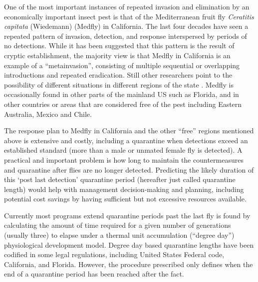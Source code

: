 \documentclass[10pt,a4paper,twocolumn]{article}
\begin{document}
One of the most important instances of repeated invasion 
and elimination by an economically important insect pest is that of 
the Mediterranean fruit fly \textit{Ceratitis capitata} (Wiedemann) (Medfly) 
in California.  
The last four decades have seen a repeated pattern of
invasion, detection, and response 
interspersed by periods of no detections\cite{carey_establishment_1991, papadopoulos_trickle_2013}.
While it has been suggested that this pattern is the result of
cryptic establishment\cite{carey201730}, 
the majority view is
that Medfly in California is an example of 
a ``metainvasion'', consisting of multiple sequential or
overlapping introductions\cite{davies_bioinvasions_1999}
and repeated eradication\cite{haymer_genetic_1997}.
Still other researchers point to the possibility of different situations
in different regions of the state
\cite{bonizzoni_microsatellite_2001,gasperi_genetic_2002}.
Medfly is occasionally found in 
other parts of the mainland US such as Florida\cite{szyniszewska2016analysis},
and in other countries or areas that are considered 
free of the pest including Eastern Australia, Mexico and Chile\cite{mcinnis2017can}.

The response plan to Medfly in California and the other ``free'' 
regions mentioned above is extensive and costly, 
including a quarantine when detections exceed an established standard
(more than a male or unmated female fly is detected)\cite{gilbert_insect_2013}.
A practical and important problem is how long to maintain 
the countermeasures and quarantine after flies are no longer detected.
Predicting the likely duration of this `post last detection' quarantine period
(hereafter just called quarantine length) would help with
management decision-making and planning,
including potential cost savings by having sufficient but not excessive
resources available.

Currently most programs extend quarantine periods past the last fly is found
by calculating the amount of time required for a given number 
of generations (usually three) to elapse under a thermal unit accumulation (``degree day'')
physiological development model.
Degree day based quarantine lengths have been codified in some legal
regulations, including 
United States Federal code\cite{US-301.32-10},
California\cite{3-CA-ADC-3406}, and Florida.
However, the procedure prescribed only defines when the end of a
quarantine period has been reached after the fact.
\end{document}
